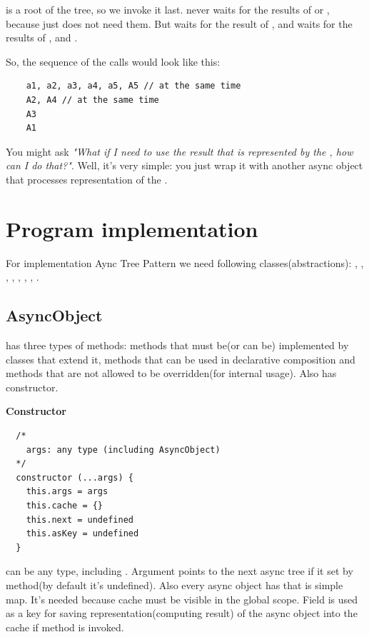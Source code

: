 \documentclass{article}
\begin{document}
 is a root of the tree, so we invoke it last.  never waits for the results of  or , because  just does not need them. But  waits for the result of , and  waits for the results of ,  and .

So, the sequence of the calls would look like this:

\begin{verbatim}
    a1, a2, a3, a4, a5, A5 // at the same time
    A2, A4 // at the same time
    A3
    A1
\end{verbatim}

You might ask \textit{"What if I need to use the result that is represented by the , how can I do that?"}. Well, it's very simple: you just wrap it with another async object that processes representation of the .

\section{Program implementation}

For implementation Aync Tree Pattern we need following classes(abstractions): , ,
, , , , , .

\subsection{AsyncObject}

 has three types of methods: methods that must be(or can be) implemented by classes that extend it, methods that can be used in declarative composition and methods that are not allowed to be overridden(for internal usage). Also  has constructor.

\vspace*{10px}
\noindent
\textbf{Constructor}

\begin{verbatim}
  /*
    args: any type (including AsyncObject)
  */
  constructor (...args) {
    this.args = args
    this.cache = {}
    this.next = undefined
    this.asKey = undefined
  }
\end{verbatim}
 can be any type, including . Argument  points to the next async tree if it set by  method(by default it's undefined). Also every async object has  that is simple map. It's needed because cache must be visible in the global scope. Field  is used as a key for saving representation(computing result) of the async object into the cache if method  is invoked.
\end{document}
